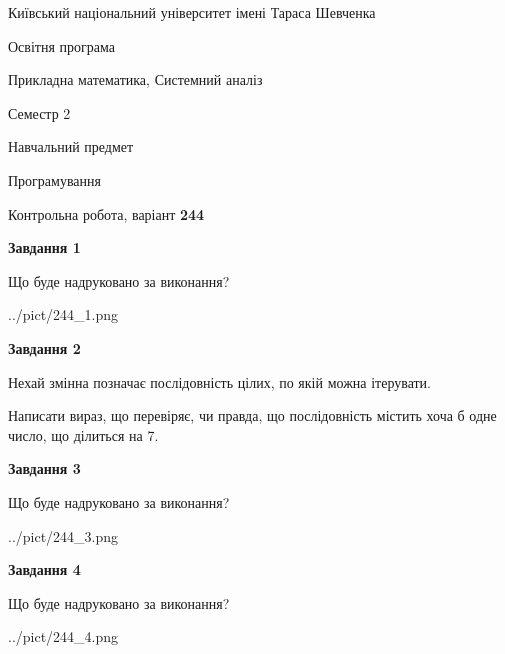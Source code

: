\documentclass[12pt, ukrainian]{article}
\begin{document}
{{\begin {small}\par
{ \center  Київський національний університет імені Тараса Шевченка \par}
{\parbox {5 cm}{Освітня програма \hfill}{\parbox {8 cm}{Прикладна математика, Системний аналіз \hfill}}\parbox {5 cm}{\hfill Семестр 2}}\par
{\parbox {5 cm} {Навчальний предмет \hfill}\parbox {7 cm}{Програмування \hfill}\parbox {6cm}{\hfill}\par}\vspace{-7pt} \end{small}}{\center Контрольна робота, варіант  \No \textbf
{ 244 }\par}}
{
\begin {large}
{\begin {center}\textbf{Завдання 1}\end {center}}\par
Що буде надруковано за виконання?\par\par
\begin{center}
	{../pict/244_1.png}
\end{center}
\newpage

{\begin {center}\textbf{Завдання 2}\end {center}}\par
Нехай змінна  позначає послідовність цілих, по якій можна ітерувати.

Написати вираз, що перевіряє, чи правда, що послідовність  містить хоча б одне число, що ділиться на 7.\par
\newpage

{\begin {center}\textbf{Завдання 3}\end {center}}\par
Що буде надруковано за виконання?\par
\begin{center}
	{../pict/244_3.png}
\end{center}
\newpage

{\begin {center}\textbf{Завдання 4}\end {center}}\par
Що буде надруковано за виконання?\par
\begin{center}
	{../pict/244_4.png}
\end{center}
\newpage


\end{large}}
\end{document}
